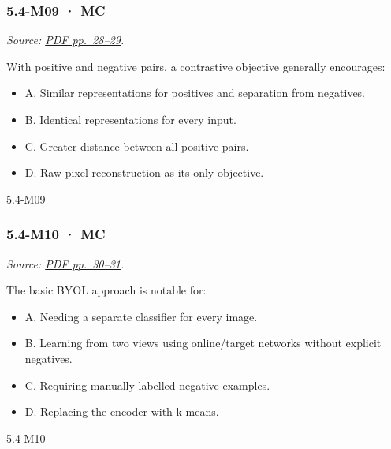 \noindent\begin{minipage}{\linewidth}

\subsubsection{5.4-M09 · MC}\label{m09-mc-15}

\emph{Source:
\href{../Lecture\%20Slides/5.4.\%20Unsupervised\%20learning.pdf\#page=28}{PDF
pp.~28--29}.}

With positive and negative pairs, a contrastive objective generally
encourages:

\begin{itemize}
\tightlist
\item
  A. Similar representations for positives and separation from
  negatives.
\item
  B. Identical representations for every input.
\item
  C. Greater distance between all positive pairs.
\item
  D. Raw pixel reconstruction as its only objective.
\end{itemize}

\begin{solution}[8mm]{5.4-M09}

\end{solution}
\end{minipage}\par\medskip

\noindent\begin{minipage}{\linewidth}

\subsubsection{5.4-M10 · MC}\label{m10-mc-15}

\emph{Source:
\href{../Lecture\%20Slides/5.4.\%20Unsupervised\%20learning.pdf\#page=30}{PDF
pp.~30--31}.}

The basic BYOL approach is notable for:

\begin{itemize}
\tightlist
\item
  A. Needing a separate classifier for every image.
\item
  B. Learning from two views using online/target networks without
  explicit negatives.
\item
  C. Requiring manually labelled negative examples.
\item
  D. Replacing the encoder with k-means.
\end{itemize}

\begin{solution}[8mm]{5.4-M10}

\end{solution}
\end{minipage}\par\medskip

